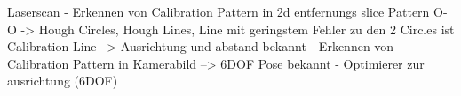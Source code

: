 


Laserscan - Erkennen von Calibration Pattern in 2d entfernungs slice Pattern
O-O -> Hough Circles, Hough Lines, Line mit geringstem Fehler zu den 2 Circles
ist Calibration Line --> Ausrichtung und abstand bekannt - Erkennen von
Calibration Pattern in Kamerabild --> 6DOF Pose bekannt - Optimierer zur
ausrichtung (6DOF)





%
